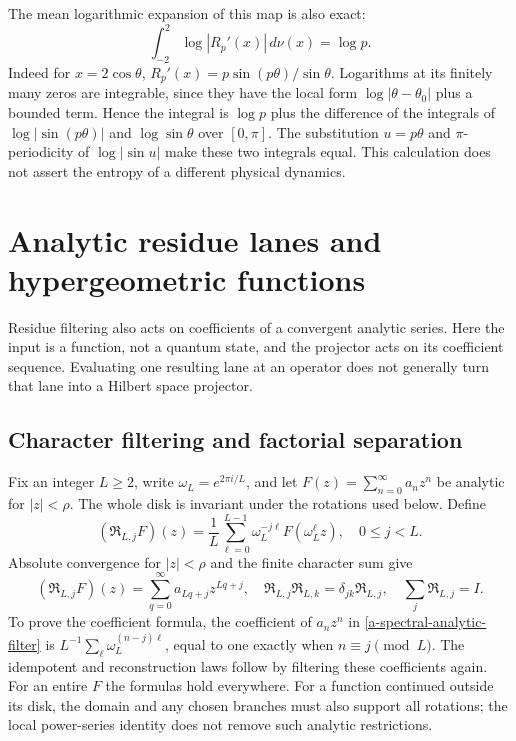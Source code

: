 The mean logarithmic expansion of this map is also exact:
\begin{equation}
 \int_{-2}^2\log|R_p'(x)|\,d\nu(x)=\log p.
 \label{a-spectral-log-expansion}
\end{equation}
Indeed for $x=2\cos\theta$,
$R_p'(x)=p\sin(p\theta)/\sin\theta$. Logarithms at its finitely
many zeros are integrable, since they have the local form
$\log|\theta-\theta_0|$ plus a bounded term. Hence the integral is
$\log p$ plus the difference of the integrals of
$\log|\sin(p\theta)|$ and $\log\sin\theta$ over $[0,\pi]$.
The substitution $u=p\theta$ and $\pi$-periodicity of
$\log|\sin u|$ make these two integrals equal. This calculation
does not assert the entropy of a different physical dynamics.



\section{Analytic residue lanes and hypergeometric functions}
\label{a-spectral-hypergeometric}

Residue filtering also acts on coefficients of a convergent analytic
series. Here the input is a function, not a quantum state, and the
projector acts on its coefficient sequence. Evaluating one resulting
lane at an operator does not generally turn that lane into a Hilbert
space projector.

\subsection{Character filtering and factorial separation}

Fix an integer $L\geq2$, write $\omega_L=e^{2\pi i/L}$, and let
$F(z)=\sum_{n=0}^\infty a_nz^n$ be analytic for $|z|<\rho$.
The whole disk is invariant under the rotations used below. Define
\begin{equation}
 (\mathfrak R_{L,j}F)(z)
 =\frac1L\sum_{\ell=0}^{L-1}\omega_L^{-j\ell}F(\omega_L^\ell z),
 \quad 0\leq j<L.
 \label{a-spectral-analytic-filter}
\end{equation}
Absolute convergence for $|z|<\rho$ and the finite character sum give
\begin{equation}
 (\mathfrak R_{L,j}F)(z)=\sum_{q=0}^\infty a_{Lq+j}z^{Lq+j},
 \quad
 \mathfrak R_{L,j}\mathfrak R_{L,k}
   =\delta_{jk}\mathfrak R_{L,j},\quad
 \sum_j\mathfrak R_{L,j}=I.
 \label{a-spectral-analytic-lanes}
\end{equation}
To prove the coefficient formula, the coefficient of $a_nz^n$ in
\eqref{a-spectral-analytic-filter} is
$L^{-1}\sum_\ell\omega_L^{(n-j)\ell}$, equal to one exactly when
$n\equiv j\pmod L$. The idempotent and reconstruction laws follow
by filtering these coefficients again. For an entire $F$ the formulas
hold everywhere. For a function continued outside its disk, the
domain and any chosen branches must also support all rotations; the
local power-series identity does not remove such analytic restrictions.

